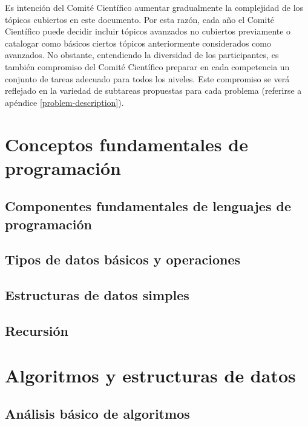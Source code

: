 \documentclass{article}
\begin{document}

Es intención del Comité Científico aumentar gradualmente la complejidad de los
tópicos cubiertos en este documento.
Por esta razón, cada año el Comité Científico puede decidir incluir tópicos
avanzados no cubiertos previamente o catalogar como básicos ciertos tópicos
anteriormente considerados como avanzados.
No obstante, entendiendo la diversidad de los participantes, es también
compromiso del Comité Científico preparar en cada competencia un conjunto de
tareas adecuado para todos los niveles.
Este compromiso se verá reflejado en la variedad de subtareas propuestas para cada
problema (referirse a apéndice \ref{problem-description}).

\section{Conceptos fundamentales de programación}

\subsection{Componentes fundamentales de lenguajes de programación}


\subsection{Tipos de datos básicos y operaciones}


\subsection{Estructuras de datos simples}


\subsection{Recursión}


\section{Algoritmos y estructuras de datos}
\subsection{Análisis básico de algoritmos}
\label{algorithm-analysis}

\end{document}
